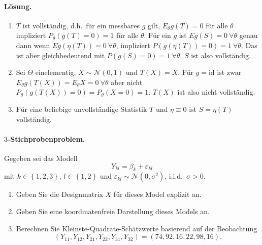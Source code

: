 \paragraph*{Lösung.}
\begin{enumerate}

    \item $T$ ist vollständig, d.h.\ für ein messbares $g$ gilt, $E_\theta g(T) = 0$ für alle $\theta$ impliziert 
        $P_\theta \left( g(T)=0  \right)=1$ für alle $\theta$. Für ein $g$ ist
        $E g(S)=0 \ \forall \theta$ genau dann wenn $E g(\eta(T))=0 \ \forall \theta$, impliziert
        $P\left( g(\eta(T))=0 \right)=1 \ \forall \theta$. Das ist aber gleichbedeutend mit 
        $P\left( g(S)=0 \right)=1 \ \forall \theta$. $S$ ist also vollständig. 

    \item Sei $\Theta$ einelementig, $X\sim \mathcal N(0,1)$ und $T(X)=X$. Für $g=\textrm{id}$ ist zwar
        $E_\theta g(T(X)) = E_\theta X = 0 \ \forall \theta$ aber nicht 
        $P_\theta \left( g(T(X))=0 \right)=  P_\theta \left( X=0 \right)=1$. $T(X)$ ist also nicht vollständig. 

    \item Für eine beliebige unvollständige Statistik $T$ und $\eta\equiv 0$ ist $S=\eta(T)$ vollständig. 

\end{enumerate}




\paragraph{$3$-Stichprobenproblem. } 
Gegeben sei das Modell
\begin{equation}
    Y_{kl} = \beta_k + \varepsilon_{kl}
\end{equation}
mit $k\in \left\{ 1,2,3 \right\}$, $l\in \left\{ 1,2 \right\}$ und 
$\varepsilon_{kl}\sim \mathcal N(0,\sigma^2)$, i.i.d.\  $\sigma>0$.
\begin{enumerate}
    \item Geben Sie die Designmatrix $X$ für dieses Model explizit an.
    \item Geben Sie eine koordinatenfreie Darstellung dieses Models an.
    \item Berechnen Sie Kleinste-Quadrate-Schätzwerte basierend auf der Beobachtung
        \begin{equation}
            \left( Y_{11},Y_{12},Y_{21},Y_{22},Y_{31},Y_{32} \right) = \left(74, 92, 16, 22, 98, 16 \right).
        \end{equation}
\end{enumerate}


